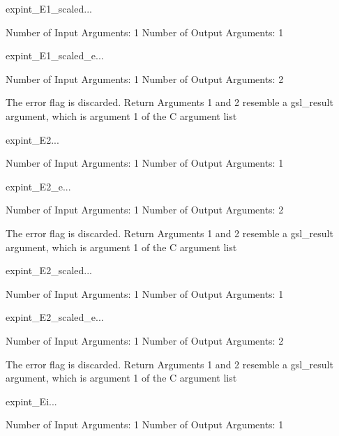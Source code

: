 \begin{funcdesc}{expint_E1_scaled}{...}

    Number of Input  Arguments:  1
    Number of Output Arguments:  1
\end{funcdesc}

\begin{funcdesc}{expint_E1_scaled_e}{...}

    Number of Input  Arguments:  1
    Number of Output Arguments:  2

The error flag is discarded.
Return Arguments 1 and 2 resemble a gsl_result argument,
	which is  argument 1 of the C argument list

\end{funcdesc}

\begin{funcdesc}{expint_E2}{...}

    Number of Input  Arguments:  1
    Number of Output Arguments:  1
\end{funcdesc}

\begin{funcdesc}{expint_E2_e}{...}

    Number of Input  Arguments:  1
    Number of Output Arguments:  2

The error flag is discarded.
Return Arguments 1 and 2 resemble a gsl_result argument,
	which is  argument 1 of the C argument list

\end{funcdesc}

\begin{funcdesc}{expint_E2_scaled}{...}

    Number of Input  Arguments:  1
    Number of Output Arguments:  1
\end{funcdesc}

\begin{funcdesc}{expint_E2_scaled_e}{...}

    Number of Input  Arguments:  1
    Number of Output Arguments:  2

The error flag is discarded.
Return Arguments 1 and 2 resemble a gsl_result argument,
	which is  argument 1 of the C argument list

\end{funcdesc}

\begin{funcdesc}{expint_Ei}{...}

    Number of Input  Arguments:  1
    Number of Output Arguments:  1
\end{funcdesc}

